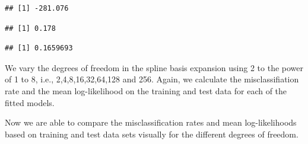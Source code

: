 \documentclass[
]{article}
\begin{document}
\begin{verbatim}
## [1] -281.076
\end{verbatim}

\begin{verbatim}
## [1] 0.178
\end{verbatim}

\begin{verbatim}
## [1] 0.1659693
\end{verbatim}

We vary the degrees of freedom in the spline basis expansion using 2 to
the power of 1 to 8, i.e., 2,4,8,16,32,64,128 and 256. Again, we
calculate the misclassifiation rate and the mean log-likelihood on the
training and test data for each of the fitted models.

Now we are able to compare the misclassification rates and mean
log-likelihoods based on training and test data sets visually for the
different degrees of freedom.
\end{document}
